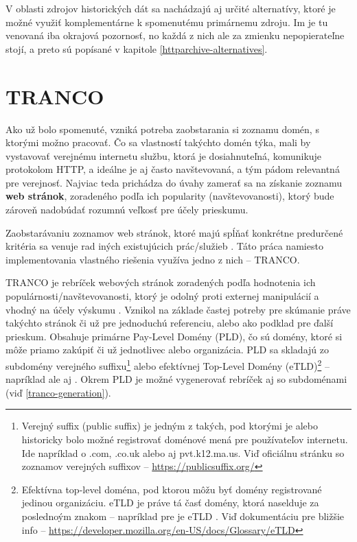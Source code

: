 V oblasti zdrojov historických dát sa nachádzajú aj určité alternatívy, ktoré je možné využiť komplementárne k spomenutému primárnemu zdroju.
Im je tu venovaná iba okrajová pozornosť, no každá z nich ale za zmienku nepopierateľne stojí, a preto sú popísané v kapitole \ref{httparchive-alternatives}.


\section{TRANCO}
\label{tranco}

Ako už bolo spomenuté, vzniká potreba zaobstarania si zoznamu domén, s ktorými možno pracovať. Čo sa vlastností takýchto domén týka,
mali by vystavovať verejnému internetu službu, ktorá je dosiahnuteľná, komunikuje protokolom HTTP, a ideálne je aj často navštevovaná,
a tým pádom relevantná pre verejnosť. Najviac teda prichádza do úvahy zamerať sa na získanie zoznamu \textbf{web stránok}, zoradeného podľa
ich popularity (navštevovanosti), ktorý bude zároveň nadobúdať rozumnú veľkosť pre účely prieskumu. 

Zaobstarávaniu zoznamov web stránok, ktoré majú spĺňať konkrétne predurčené kritéria sa venuje rad iných existujúcich prác/služieb 
\cite{tranco}\cite{hacker-target-website-lists-overview}. Táto práca namiesto implementovania vlastného riešenia využíva jedno z nich -- TRANCO.

TRANCO je rebríček webových stránok zoradených podľa hodnotenia ich populárnosti/navštevovanosti, ktorý je odolný proti externej manipulácií a vhodný na účely výskumu \cite{tranco-homepage}. 
Vznikol na základe častej potreby pre skúmanie práve takýchto stránok či už pre jednoduchú referenciu, alebo ako podklad pre ďalší prieskum.
Obsahuje primárne Pay-Level Domény (PLD), čo sú domény, ktoré si môže priamo zakúpiť či už jednotlivec alebo organizácia. PLD sa skladajú zo subdomény verejného 
suffixu\footnote{Verejný suffix (public suffix) je jedným z takých, pod ktorými je alebo historicky bolo možné registrovať doménové mená pre používateľov internetu. Ide napríklad o .com, .co.uk 
alebo aj pvt.k12.ma.us. Viď oficiálnu stránku so zoznamov verejných suffixov -- \href{https://publicsuffix.org/}{https://publicsuffix.org/}} 
alebo efektívnej Top-Level Domény (eTLD)\footnote{Efektívna top-level doména, pod ktorou môžu byť domény registrované jedinou organizáciu. eTLD je práve tá časť domény, ktorá naselduje za poslednoým 
znakom  -- napríklad pre  je eTLD . Viď dokumentáciu pre bližšie info -- \href{https://developer.mozilla.org/en-US/docs/Glossary/eTLD}
{https://developer.mozilla.org/en-US/docs/Glossary/eTLD}} -- napríklad  ale aj  \cite{tranco}. Okrem PLD je možné vygenerovať rebríček aj so subdoménami (viď 
\ref{tranco-generation}).

